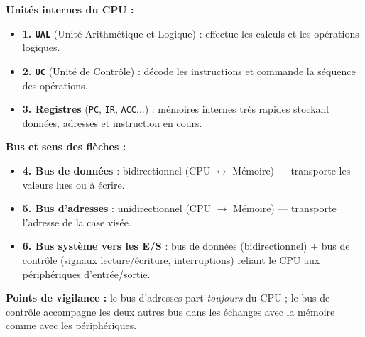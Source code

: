 \documentclass[11pt]{article}
\begin{document}
\begin{corrige}
\textbf{Unités internes du CPU :}
\begin{itemize}
    \item \textbf{1. \texttt{UAL}} (Unité Arithmétique et Logique) : effectue les calculs et les opérations logiques.
    \item \textbf{2. \texttt{UC}} (Unité de Contrôle) : décode les instructions et commande la séquence des opérations.
    \item \textbf{3. Registres} (\texttt{PC}, \texttt{IR}, \texttt{ACC}...) : mémoires internes très rapides stockant données, adresses et instruction en cours.
\end{itemize}
\textbf{Bus et sens des flèches :}
\begin{itemize}
    \item \textbf{4. Bus de données} : bidirectionnel (CPU $\leftrightarrow$ Mémoire) — transporte les valeurs lues ou à écrire.
    \item \textbf{5. Bus d'adresses} : unidirectionnel (CPU $\to$ Mémoire) — transporte l'adresse de la case visée.
    \item \textbf{6. Bus système vers les E/S} : bus de données (bidirectionnel) + bus de contrôle (signaux lecture/écriture, interruptions) reliant le CPU aux périphériques d'entrée/sortie.
\end{itemize}
\textbf{Points de vigilance :} le bus d'adresses part \emph{toujours} du CPU ; le bus de contrôle accompagne les deux autres bus dans les échanges avec la mémoire comme avec les périphériques.
\end{corrige}
\end{document}
